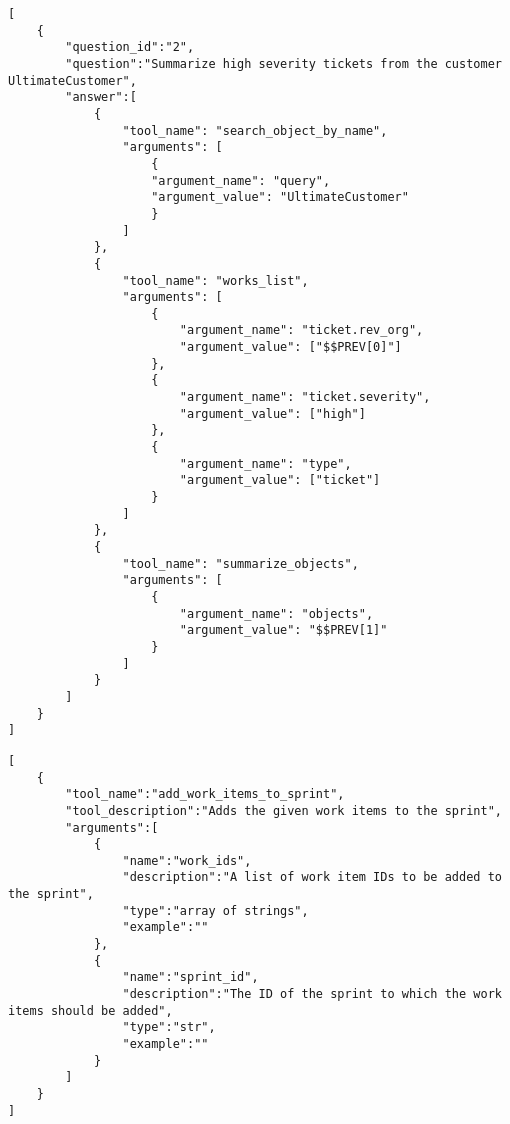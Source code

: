 \documentclass[10pt,twocolumn,letterpaper]{article}
\begin{document}
\begin{lstlisting}[style=json, caption={An illustrative Question-Answer Pair in JSON Format}, label={lst:json-example}]
[    
    {
        "question_id":"2",
        "question":"Summarize high severity tickets from the customer UltimateCustomer",
        "answer":[
            {
                "tool_name": "search_object_by_name",
                "arguments": [
                    {
                    "argument_name": "query",
                    "argument_value": "UltimateCustomer"
                    }
                ]
            },
            {
                "tool_name": "works_list",
                "arguments": [
                    {
                        "argument_name": "ticket.rev_org",
                        "argument_value": ["$$PREV[0]"]
                    },
                    {
                        "argument_name": "ticket.severity",
                        "argument_value": ["high"]
                    },
                    {
                        "argument_name": "type",
                        "argument_value": ["ticket"]
                    }
                ]
            },
            {
                "tool_name": "summarize_objects",
                "arguments": [
                    {
                        "argument_name": "objects",
                        "argument_value": "$$PREV[1]"
                    }
                ]
            }
        ]
    }
]
\end{lstlisting}

\begin{lstlisting}[style=json, caption={Representation of Provided Tools in JSON Format}, label={lst:json-example}]
[
    {
        "tool_name":"add_work_items_to_sprint",
        "tool_description":"Adds the given work items to the sprint",
        "arguments":[
            {
                "name":"work_ids",
                "description":"A list of work item IDs to be added to the sprint",
                "type":"array of strings",
                "example":""
            },
            {
                "name":"sprint_id",
                "description":"The ID of the sprint to which the work items should be added",
                "type":"str",
                "example":""
            }
        ]
    }
]
\end{lstlisting}
\end{document}
